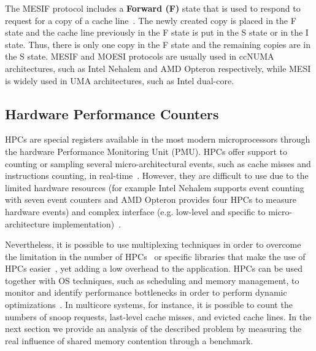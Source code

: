 \documentclass[conference]{IEEEtran}
\begin{document}
The MESIF protocol includes a \textbf{Forward (F)} state that is used to respond to request for a copy of a cache line~\cite{intel}. The newly created copy is placed in the F state and the cache line previously in the F state is put in the S state or in the I state. Thus, there is only one copy in the F state and the remaining copies are in the S state. MESIF and MOESI protocols are usually used in ccNUMA architectures, such as Intel Nehalem and AMD Opteron respectively, while MESI is widely used in UMA architectures, such as Intel dual-core.

\subsection{Hardware Performance Counters}

HPCs are special registers available in the most modern microprocessors through the hardware Performance Monitoring Unit (PMU). HPCs offer support to counting or sampling several micro-architectural events, such as cache misses and instructions counting, in real-time~\cite{Sprunt:02}. However, they are difficult to use due to the limited hardware resources (for example Intel Nehalem supports event counting with seven event counters and AMD Opteron provides four HPCs to measure hardware events) and complex interface (e.g. low-level and specific to micro-architecture implementation)~\cite{Azimi:2005}.

Nevertheless, it is possible to use multiplexing techniques in order to overcome the limitation in the number of HPCs~\cite{May:01, Sprunt:02} or specific libraries that make the use of HPCs easier~\cite{Dongarra:2003}, yet adding a low overhead to the application. HPCs can be used together with OS techniques, such as scheduling and memory management, to monitor and identify performance bottlenecks in order to perform dynamic optimizations~\cite{Azimi:2009}. In multicore systems, for instance, it is possible to count the numbers of snoop requests, last-level cache misses, and evicted cache lines. In the next section we provide an analysis of the described problem by measuring the real influence of shared memory contention through a benchmark.
\end{document}
